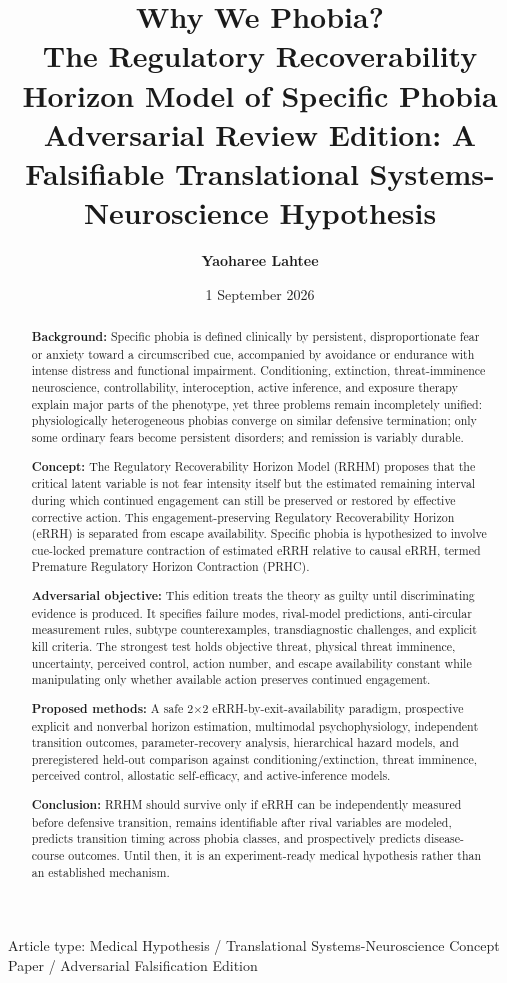 \documentclass[9pt,twocolumn]{article}
\title{\vspace{-1.1em}
{\sffamily\bfseries\fontsize{19}{21}\selectfont\color{RRHMNavy} Why We Phobia?}\\[0.35em]
{\sffamily\bfseries\fontsize{12.0}{14}\selectfont The Regulatory Recoverability Horizon Model of Specific Phobia}\\[0.18em]
{\sffamily\fontsize{9.2}{11}\selectfont\color{RRHMSlate} Adversarial Review Edition: A Falsifiable Translational Systems-Neuroscience Hypothesis}}
\author{\sffamily\bfseries Yaoharee Lahtee}
\date{\sffamily\small 1 September 2026}
\begin{document}
\maketitle

\begin{center}
\small\sffamily\color{RRHMSlate}
Article type: Medical Hypothesis / Translational Systems-Neuroscience Concept Paper / Adversarial Falsification Edition
\end{center}

\begin{abstract}
\textbf{Background:} Specific phobia is defined clinically by persistent, disproportionate fear or anxiety toward a circumscribed cue, accompanied by avoidance or endurance with intense distress and functional impairment. Conditioning, extinction, threat-imminence neuroscience, controllability, interoception, active inference, and exposure therapy explain major parts of the phenotype, yet three problems remain incompletely unified: physiologically heterogeneous phobias converge on similar defensive termination; only some ordinary fears become persistent disorders; and remission is variably durable.

\textbf{Concept:} The Regulatory Recoverability Horizon Model (RRHM) proposes that the critical latent variable is not fear intensity itself but the estimated remaining interval during which continued engagement can still be preserved or restored by effective corrective action. This engagement-preserving Regulatory Recoverability Horizon (eRRH) is separated from escape availability. Specific phobia is hypothesized to involve cue-locked premature contraction of estimated eRRH relative to causal eRRH, termed Premature Regulatory Horizon Contraction (PRHC).

\textbf{Adversarial objective:} This edition treats the theory as guilty until discriminating evidence is produced. It specifies failure modes, rival-model predictions, anti-circular measurement rules, subtype counterexamples, transdiagnostic challenges, and explicit kill criteria. The strongest test holds objective threat, physical threat imminence, uncertainty, perceived control, action number, and escape availability constant while manipulating only whether available action preserves continued engagement.

\textbf{Proposed methods:} A safe 2$\times$2 eRRH-by-exit-availability paradigm, prospective explicit and nonverbal horizon estimation, multimodal psychophysiology, independent transition outcomes, parameter-recovery analysis, hierarchical hazard models, and preregistered held-out comparison against conditioning/extinction, threat imminence, perceived control, allostatic self-efficacy, and active-inference models.

\textbf{Conclusion:} RRHM should survive only if eRRH can be independently measured before defensive transition, remains identifiable after rival variables are modeled, predicts transition timing across phobia classes, and prospectively predicts disease-course outcomes. Until then, it is an experiment-ready medical hypothesis rather than an established mechanism.
\end{abstract}
\end{document}

